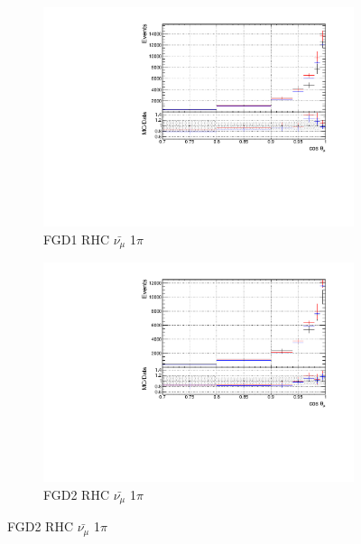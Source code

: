\begin{figure}[!h]
\begin{subfigure}{0.49\textwidth}
  \centering
  \includegraphics[width=\textwidth]{figs/priorpred1D_t_FGD1_anti-numuCC_1pi}
  \caption{FGD1 RHC $\bar{\nu_{\mu}}$ 1$\pi$}
\end{subfigure}
\centering
\begin{subfigure}{0.49\textwidth}
  \centering
  \includegraphics[width=\textwidth]{figs/priorpred1D_t_FGD2_anti-numuCC_1pi}
  \caption{FGD2 RHC $\bar{\nu_{\mu}}$ 1$\pi$}
\end{subfigure}


\end{figure}
